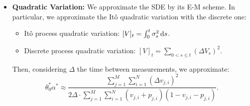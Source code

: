 \documentclass[11pt]{article}
\theoremstyle{definition}
\begin{document}
\begin{itemize}
\item \textbf{Quadratic Variation:} We approximate the SDE by its E-M scheme. In particular, we approximate the It\^o quadratic variation with the discrete one:
\begin{itemize}

\item It\^o process quadratic variation: $[V]_t=\int_0^t\sigma_s^2\dif s$.
\item Discrete process quadratic variation: $[V]_t=\sum_{0<s\leq t}(\Delta V_s)^2$.

\end{itemize}

Then, considering $\Delta$ the time between measurements, we approximate:
\begin{equation}
\theta_0^*\alpha^*\approx\frac{\sum_{j=1}^M\sum_{i=1}^N(\Delta v_{j,i})^2}{2\Delta\cdot\sum_{j=1}^M\sum_{i=1}^N(v_{j,i}+p_{j,i})(1-v_{j,i}-p_{j,i})}.
\label{Eq-2}
\end{equation}

\end{itemize}

%
\end{document}
